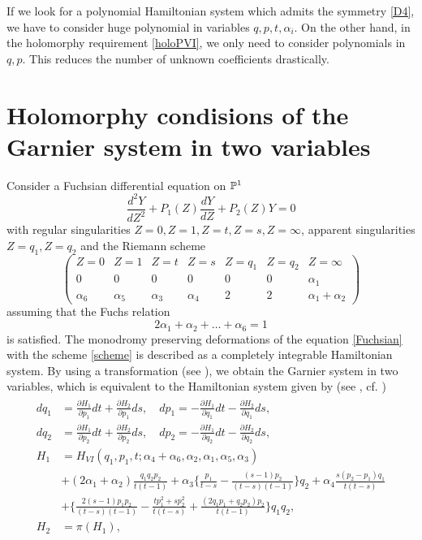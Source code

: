\begin{rem}\rm{
If we look for a polynomial Hamiltonian system which admits the symmetry \eqref{D4}, we have to consider huge polynomial in variables $q,p,t,\alpha_i$. On the other hand, in the holomorphy requirement \eqref{holoPVI}, we only need to consider polynomials in $q,p$. This reduces the number of unknown coefficients drastically.
\rm}
\end{rem}



\section{Holomorphy condisions of the Garnier system in two variables}
Consider a Fuchsian differential equation on ${\Bbb P}^1$
\begin{equation}\label{Fuchsian}
\frac{d^2Y}{dZ^2}+P_1(Z)\frac{dY}{dZ}+P_2(Z)Y=0
\end{equation}
with regular singularities $Z=0,Z=1,Z=t,Z=s,Z=\infty$, apparent singularities $Z=q_1,Z=q_2$ and the Riemann scheme
\begin{equation}\label{scheme}
\begin{pmatrix}
Z=0 & Z=1 & Z=t & Z=s & Z=q_1 & Z=q_2 & Z=\infty\\
0 & 0 & 0 & 0 & 0 & 0 & \alpha_1\\
\alpha_6 & \alpha_5 & \alpha_3 & \alpha_4 & 2 & 2 & \alpha_1+\alpha_2
\end{pmatrix}
\end{equation}
assuming that the Fuchs relation
\begin{equation}
2\alpha_1+\alpha_2+\dots +\alpha_6=1
\end{equation}
is satisfied. The monodromy preserving deformations of the equation \eqref{Fuchsian} with the scheme \eqref{scheme} is described as a completely integrable Hamiltonian system. By using a transformation (see \cite{S}), we obtain the Garnier system in two variables, which is equivalent to the Hamiltonian system given by (see \cite{S}, cf. \cite{Oka})
\begin{align}\label{1}
\begin{split}
dq_1&=\frac{\partial H_1}{\partial p_1}dt+\frac{\partial H_2}{\partial p_1}ds, \quad dp_1=-\frac{\partial H_1}{\partial q_1}dt-\frac{\partial H_2}{\partial q_1}ds,\\
dq_2&=\frac{\partial H_1}{\partial p_2}dt+\frac{\partial H_2}{\partial p_2}ds, \quad dp_2=-\frac{\partial H_1}{\partial q_2}dt-\frac{\partial H_2}{\partial q_2}ds,\\
H_1 &=H_{VI}(q_1,p_1,t;\alpha_4+\alpha_6,\alpha_2,\alpha_1,\alpha_5,\alpha_3)\\
&+(2\alpha_1+\alpha_2)\frac{q_1q_2p_2}{t(t-1)}+\alpha_3\{\frac{p_1}{t-s}-\frac{(s-1)p_2}{(t-s)(t-1)}\}q_2+\alpha_4\frac{s(p_2-p_1)q_1}{t(t-s)}\\
&+\{\frac{2(s-1)p_1p_2}{(t-s)(t-1)}-\frac{tp_1^2+sp_2^2}{t(t-s)}+\frac{(2q_1p_1+q_2p_2)p_2}{t(t-1)}\}q_1q_2,\\
H_2&=\pi(H_1),
\end{split}
\end{align}
